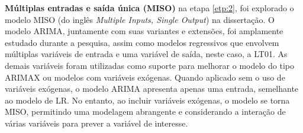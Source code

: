 \textbf{M\'ultiplas entradas e sa\'ida \'unica (MISO)}
na etapa \ref{etp:2}, foi explorado o modelo MISO (do inglês \textit{Multiple Inputs, Single Output}) na dissertação. O modelo ARIMA, juntamente com suas variantes e extensões, foi amplamente estudado durante a pesquisa, assim como modelos regressivos que envolvem múltiplas variáveis de entrada e uma variável de saída, neste caso, a LT01. As demais variáveis foram utilizadas como suporte para melhorar o modelo do tipo ARIMAX ou modelos com variáveis exógenas. Quando aplicado sem o uso de variáveis exógenas, o modelo ARIMA apresenta apenas uma entrada, semelhante ao modelo de LR. No entanto, ao incluir variáveis exógenas, o modelo se torna MISO, permitindo uma modelagem  abrangente e considerando a interação de várias variáveis para prever a variável de interesse.
